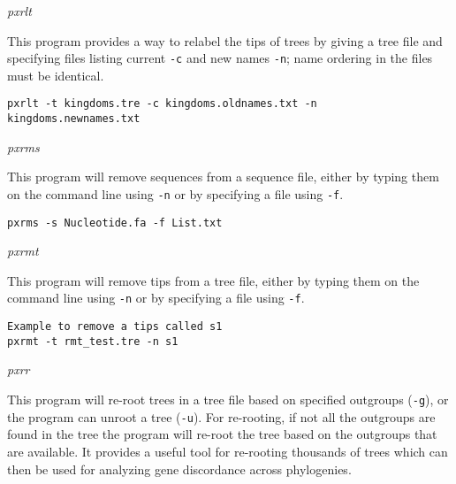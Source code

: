 \documentclass[12pt,letterpaper]{article}
\renewcommand{\subsection}[1]{%
\bigskip
\begin{center}
\begin{large}
\normalfont\itshape #1
\end{large}
\end{center}}
\begin{document}
\subsection{pxrlt}

This program provides a way to relabel the tips of trees by giving a tree file and specifying files listing current \texttt{-c} and new names \texttt{-n}; name ordering in the files must be identical.

\begin{flushleft}
\begin{verbatim}
pxrlt -t kingdoms.tre -c kingdoms.oldnames.txt -n kingdoms.newnames.txt
\end{verbatim}
\end{flushleft}

\subsection{pxrms}

This program will remove sequences from a sequence file, either by typing them on the command line using \texttt{-n} or by specifying a file using \texttt{-f}.

\begin{flushleft}
\begin{verbatim}
pxrms -s Nucleotide.fa -f List.txt
\end{verbatim}
\end{flushleft}

\subsection{pxrmt}

This program will remove tips from a tree file, either by typing them on the command line using \texttt{-n} or by specifying a file using \texttt{-f}.

\begin{flushleft}
\begin{verbatim}
Example to remove a tips called s1
pxrmt -t rmt_test.tre -n s1
\end{verbatim}
\end{flushleft}

\subsection{pxrr}

This program will re-root trees in a tree file based on specified outgroups (\texttt{-g}), or the program can unroot a tree (\texttt{-u}). For re-rooting, if not all the outgroups are found in the tree the program will re-root the tree based on the outgroups that are available. It provides a useful tool for re-rooting thousands of trees which can then be used for analyzing gene discordance across phylogenies.
\end{document}
